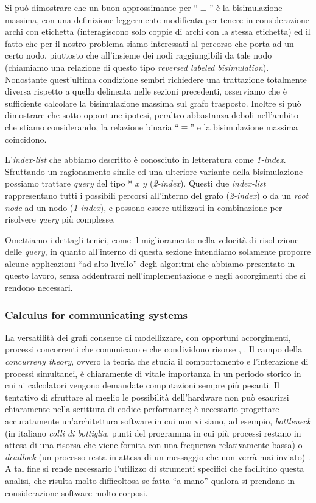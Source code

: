 Si può dimostrare che un buon approssimante per ``$\equiv$'' è la bisimulazione massima, con una definizione leggermente modificata per tenere in considerazione archi con etichetta (interagiscono solo coppie di archi con la stessa etichetta) ed il fatto che per il nostro problema siamo interessati al percorso che porta ad un certo nodo, piuttosto che all'insieme dei nodi raggiungibili da tale nodo (chiamiamo una relazione di questo tipo \emph{reversed labeled bisimulation}). Nonostante quest'ultima condizione sembri richiedere una trattazione totalmente diversa rispetto a quella delineata nelle sezioni precedenti, osserviamo che è sufficiente calcolare la bisimulazione massima sul grafo trasposto. Inoltre si può dimostrare che sotto opportune ipotesi, peraltro abbastanza deboli nell'ambito che stiamo considerando, la relazione binaria ``$\equiv$'' e la bisimulazione massima coincidono.

L'\emph{index-list} che abbiamo descritto è conosciuto in letteratura come \emph{1-index}. Sfruttando un ragionamento simile ed una ulteriore variante della bisimulazione possiamo trattare \emph{query} del tipo * $x$  $y$ (\emph{2-index}). Questi due \emph{index-list} rappresentano tutti i possibili percorsi all'interno del grafo (\emph{2-index}) o da un \emph{root node} ad un nodo (\emph{1-index}), e possono essere utilizzati in combinazione per risolvere \emph{query} più complesse.

Omettiamo i dettagli tenici, come il miglioramento nella velocità di risoluzione delle \emph{query}, in quanto all'interno di questa sezione intendiamo solamente proporre alcune applicazioni ``ad alto livello'' degli algoritmi che abbiamo presentato in questo lavoro, senza addentrarci nell'implementazione e negli accorgimenti che si rendono necessari.

\subsubsection{Calculus for communicating systems}
La versatilità dei grafi consente di modellizzare, con opportuni accorgimenti, processi concorrenti che comunicano e che condividono risorse \cite{milner}, \cite{intro_calculus}. Il campo della \emph{concurreny theory}, ovvero la teoria che studia il comportamento e l'interazione di processi simultanei, è chiaramente di vitale importanza in un periodo storico in cui ai calcolatori vengono demandate computazioni sempre più pesanti. Il tentativo di sfruttare al meglio le possibilità dell'hardware non può esaurirsi chiaramente nella scrittura di codice performarne; è necessario progettare accuratamente un'architettura software in cui non vi siano, ad esempio, \emph{bottleneck} (in italiano \emph{colli di bottiglia}, punti del programma in cui più processi restano in attesa di una risorsa che viene fornita con una frequenza relativamente bassa) o \emph{deadlock} (un processo resta in attesa di un messaggio che non verrà mai inviato) \cite{concurrency}. A tal fine si rende necessario l'utilizzo di strumenti specifici che facilitino questa analisi, che risulta molto difficoltosa se fatta ``a mano'' qualora si prendano in considerazione software molto corposi.

